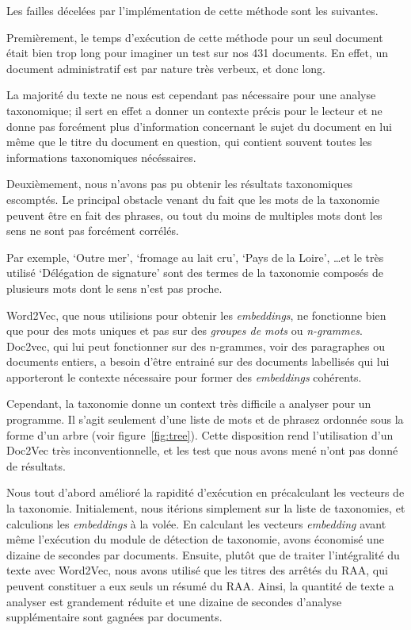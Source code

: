 Les failles décelées par l'implémentation de cette méthode sont les suivantes.

Premièrement, le temps d'exécution de cette méthode pour un seul document était bien trop long pour imaginer un test sur nos 431 documents.
En effet, un document administratif est par nature très verbeux, et donc long.

La majorité du texte ne nous est cependant pas nécessaire pour une analyse taxonomique; 
il sert en effet a donner un contexte précis pour le lecteur et ne donne pas forcément plus d'information concernant le sujet du document en lui même que le titre du document en question, qui contient souvent toutes les informations taxonomiques nécéssaires. 


Deuxièmement, nous n'avons pas pu obtenir les résultats taxonomiques escomptés.
Le principal obstacle venant du fait que les mots de la taxonomie peuvent être en fait des phrases, ou tout du moins de multiples mots dont les sens ne sont pas forcément corrélés.

Par exemple, `Outre mer', `fromage au lait cru', `Pays de la Loire', \ldots et le très utilisé `Délégation de signature' sont des termes de la taxonomie composés de plusieurs mots dont le sens n'est pas proche.

Word2Vec, que nous utilisions pour obtenir les \textit{embeddings}, ne fonctionne bien que pour des mots uniques et pas sur des \textit{groupes de mots} ou \textit{n-grammes}.
Doc2vec, qui lui peut fonctionner sur des n-grammes, voir des paragraphes ou documents entiers, a besoin d'être entrainé sur des documents labellisés qui lui apporteront le contexte nécessaire pour former des \textit{embeddings} cohérents.


Cependant, la taxonomie donne un context très difficile a analyser pour un programme.
Il s'agit seulement d'une liste de mots et de phrasez ordonnée sous la forme d'un arbre (voir figure~\ref{fig:tree}).
Cette disposition rend l'utilisation d'un Doc2Vec très inconventionnelle, et les test que nous avons mené n'ont pas donné de résultats.


Nous tout d'abord amélioré la rapidité d'exécution en précalculant les vecteurs de la taxonomie.
Initialement, nous itérions simplement sur la liste de taxonomies, et calculions les \textit{embeddings} à la volée.
En calculant les vecteurs \textit{embedding} avant même l'exécution du module de détection de taxonomie, avons économisé une dizaine de secondes par documents.
Ensuite, plutôt que de traiter l'intégralité du texte avec Word2Vec, nous avons utilisé que les titres des arrêtés du RAA, qui peuvent constituer a eux seuls un résumé du RAA\@.
Ainsi, la quantité de texte a analyser est grandement réduite et une dizaine de secondes d'analyse supplémentaire sont gagnées par documents.

